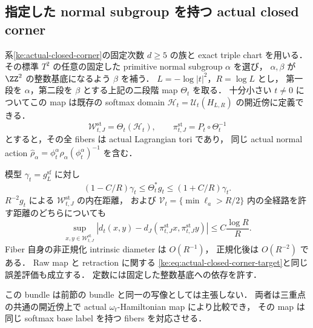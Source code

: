 \subsection{指定した normal subgroup を持つ actual closed corner}

\begin{corollary}
\label{ke:staged-closed-corner-gh}
系\ref{ke:actual-closed-corner}の固定次数 $d\ge5$ の族と exact triple chart を用いる．
その標準 $T^2$ の任意の固定した primitive normal subgroup $\alpha$ を選び，
$\alpha,\beta$ が $\ZZ^2$ の整数基底になるよう $\beta$ を補う．
$L=-\log|t|^2$，$R=\log L$ とし，
第一段を $\alpha$，第二段を $\beta$ とする上記の二段階 map $\Theta_t$ を取る．
十分小さい $t\ne0$ についてこの map は既存の softmax domain
$\mathcal H_t=\mathcal U_t(H_{L,R})$ の開近傍に定義できる．
\[
 \mathcal W_{t,J}^{\mathrm{st}}=\Theta_t(\mathcal H_t),\qquad
 \pi_{t,J}^{\mathrm{st}}=P_t\circ\Theta_t^{-1}
\]
とすると，その全 fibers は actual Lagrangian tori であり，
同じ actual normal action
$\widehat\rho_\alpha=\phi_t^\alpha\rho_\alpha(\phi_t^\alpha)^{-1}$ を含む．

模型 $\gamma_t=g_L^{\mathrm{sf}}$ に対し
\begin{equation}\label{ke:eq:staged-actual-metric}
 (1-C/R)\gamma_t\le\Theta_t^*g_t\le(1+C/R)\gamma_t.
\end{equation}
$R^{-2}g_t$ による $\mathcal W_{t,J}^{\mathrm{st}}$ の内在距離，
および $\mathcal V_t=\{\min\ell_a>R/2\}$ 内の全経路を許す距離のどちらについても
\begin{equation}\label{ke:eq:staged-closed-distortion}
 \sup_{x,y\in\mathcal W_{t,J}^{\mathrm{st}}}
 \left|d_t(x,y)-d_J(\pi_{t,J}^{\mathrm{st}}x,\pi_{t,J}^{\mathrm{st}}y)\right|
 \le C\frac{\log R}{R}.
\end{equation}
Fiber 自身の非正規化 intrinsic diameter は $O(R^{-1})$，
正規化後は $O(R^{-2})$ である．
Raw map と retraction に関する
\eqref{ke:eq:actual-closed-corner-target}と同じ誤差評価も成立する．
定数には固定した整数基底への依存を許す．

この bundle は前節の bundle と同一の写像としては主張しない．
両者は三重点の共通の開近傍上で actual $\omega_t$-Hamiltonian map により比較でき，
その map は同じ softmax base label を持つ fibers を対応させる．
\end{corollary}
